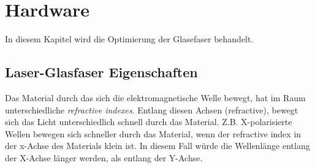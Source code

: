 \section{Hardware}
In diesem Kapitel wird die Optimierung der Glasefaser behandelt.

\subsection{Laser-Glasfaser Eigenschaften}
Das Material durch das sich die elektromagnetische Welle bewegt, hat im Raum unterschiedliche \textit{refractive indexes}. Entlang diesen Achsen (refractive), bewegt sich das Licht unterschiedlich schnell durch das Material. Z.B. X-polarisierte Wellen bewegen sich schneller durch das Material, wenn der refractive index in der x-Achse des Materials klein ist. In diesem Fall würde die Wellenlänge entlang der X-Achse länger werden, als entlang der Y-Achse.


%
